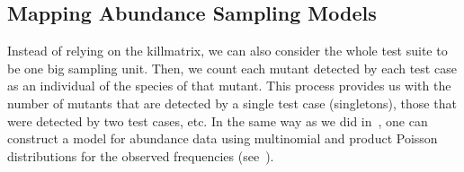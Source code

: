\documentclass[sigconf,review,anonymous]{acmart}
\begin{document}
\subsection{Mapping Abundance Sampling Models}
Instead of relying on the killmatrix, we can also consider the whole test suite to be one big sampling unit.
%
Then, we count each mutant detected by each test case as an individual of the species of that mutant.
%
This process provides us with the number of mutants that
are detected by a single test case (singletons), those that were detected by
two test cases, etc. 
%
In the same way as we did in~, one can construct
a model for abundance data using multinomial and product 
Poisson distributions for the observed frequencies (see~\cite{chao2016species}).

%
%
%



\end{document}
